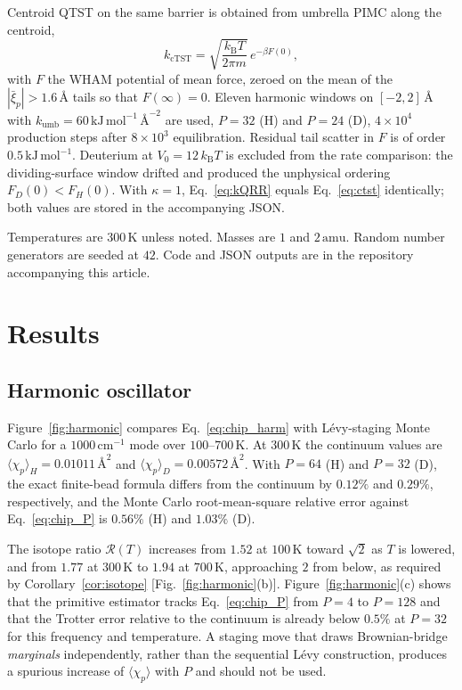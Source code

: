 \documentclass[%
 aip,
 jcp,
 amsmath,amssymb,
 reprint,
 floatfix,
]{revtex4-2}
\newcommand{\avg}[1]{\langle #1 \rangle}
\newcommand{\xip}{\bar{\xi}_p}
\newcommand{\chip}{\chi_p}
\newcommand{\kB}{k_{\mathrm{B}}}
\newcommand{\kcTST}{k_{\mathrm{cTST}}}
\begin{document}
Centroid QTST on the same barrier is obtained from umbrella PIMC along the centroid,
\begin{equation}
  \kcTST
  =
  \sqrt{\frac{\kB T}{2\pi m}}\,e^{-\beta F(0)},
  \label{eq:ctst}
\end{equation}
with $F$ the WHAM potential of mean force, zeroed on the mean of the $|\xip|>1.6\,\text{\AA}$ tails so that $F(\infty)=0$. Eleven harmonic windows on $[-2,2]\,\text{\AA}$ with $k_{\mathrm{umb}}=60\,\mathrm{kJ\,mol}^{-1}\,\text{\AA}^{-2}$ are used, $P=32$ (H) and $P=24$ (D), $4\times 10^4$ production steps after $8\times 10^3$ equilibration. Residual tail scatter in $F$ is of order $0.5\,\mathrm{kJ\,mol}^{-1}$. Deuterium at $V_0=12\,\kB T$ is excluded from the rate comparison: the dividing-surface window drifted and produced the unphysical ordering $F_D(0)<F_H(0)$. With $\kappa=1$, Eq.~\eqref{eq:kQRR} equals Eq.~\eqref{eq:ctst} identically; both values are stored in the accompanying JSON.

Temperatures are $300\,\mathrm{K}$ unless noted. Masses are $1$ and $2\,\mathrm{amu}$. Random number generators are seeded at $42$. Code and JSON outputs are in the repository accompanying this article.

\section{Results}
\label{sec:results}

\subsection{Harmonic oscillator}

Figure~\ref{fig:harmonic} compares Eq.~\eqref{eq:chip_harm} with L\'evy-staging Monte Carlo for a $1000\,\mathrm{cm}^{-1}$ mode over $100$--$700\,\mathrm{K}$. At $300\,\mathrm{K}$ the continuum values are $\avg{\chip}_H=0.01011\,\text{\AA}^2$ and $\avg{\chip}_D=0.00572\,\text{\AA}^2$. With $P=64$ (H) and $P=32$ (D), the exact finite-bead formula differs from the continuum by $0.12\%$ and $0.29\%$, respectively, and the Monte Carlo root-mean-square relative error against Eq.~\eqref{eq:chip_P} is $0.56\%$ (H) and $1.03\%$ (D).

The isotope ratio $\mathcal{R}(T)$ increases from $1.52$ at $100\,\mathrm{K}$ toward $\sqrt{2}$ as $T$ is lowered, and from $1.77$ at $300\,\mathrm{K}$ to $1.94$ at $700\,\mathrm{K}$, approaching $2$ from below, as required by Corollary~\ref{cor:isotope} [Fig.~\ref{fig:harmonic}(b)]. Figure~\ref{fig:harmonic}(c) shows that the primitive estimator tracks Eq.~\eqref{eq:chip_P} from $P=4$ to $P=128$ and that the Trotter error relative to the continuum is already below $0.5\%$ at $P=32$ for this frequency and temperature. A staging move that draws Brownian-bridge \emph{marginals} independently, rather than the sequential L\'evy construction, produces a spurious increase of $\avg{\chip}$ with $P$ and should not be used.
\end{document}
